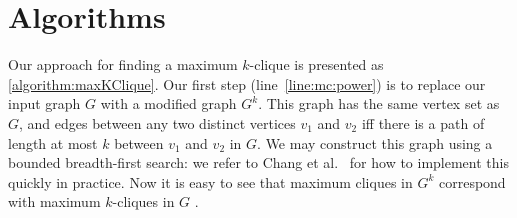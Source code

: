\documentclass[letterpaper]{article}
\newcommand{\mcline}[1]{line~\ref{line:mc:#1}}
\begin{document}
\section{Algorithms}

Our approach for finding a maximum $k$-clique is presented as \cref{algorithm:maxKClique}. Our first
step (\mcline{power}) is to replace our input graph $G$ with a modified graph $G^k$. This graph has
the same vertex set as $G$, and edges between any two distinct vertices $v_1$ and $v_2$ iff there is
a path of length at most $k$ between $v_1$ and $v_2$ in $G$. We may construct this graph using a
bounded breadth-first search: we refer to Chang et al.\ \cite{Chang:2013} for how to implement this
quickly in practice. Now it is easy to see that maximum cliques in $G^k$ correspond with maximum
$k$-cliques in $G$ \cite{Balasundaram:2005}.
\end{document}
